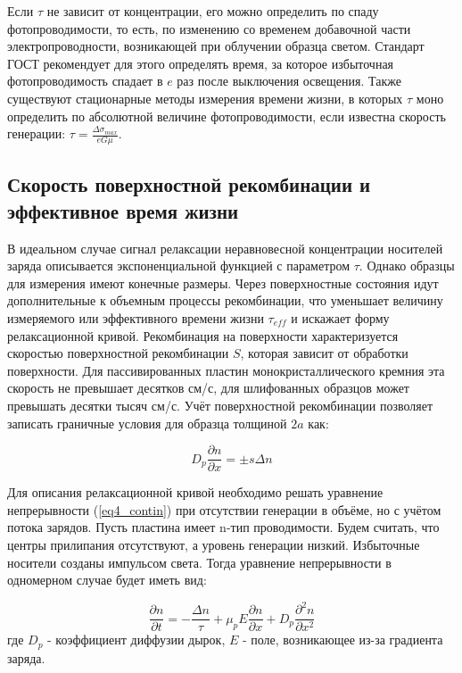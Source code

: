 Если $\tau$ не зависит от концентрации, его можно определить по спаду фотопроводимости, то есть, по изменению со временем добавочной части электропроводности, возникающей при облучении образца светом. Стандарт ГОСТ рекомендует для этого определять время, за которое избыточная фотопроводимость спадает в $e$ раз после выключения освещения. Также существуют стационарные методы измерения времени жизни, в которых $\tau$ моно определить по абсолютной величине фотопроводимости, если известна скорость генерации: $\tau = \frac{\Delta \sigma_{max}}{e G \mu}$.

\subsection{Скорость поверхностной рекомбинации и эффективное время жизни}

В идеальном случае сигнал релаксации неравновесной концентрации носителей заряда описывается экспоненциальной функцией с параметром $\tau$. Однако образцы для измерения имеют конечные размеры. Через поверхностные состояния идут дополнительные к объемным процессы рекомбинации, что уменьшает величину измеряемого или эффективного времени жизни $\tau_{eff}$ и искажает форму релаксационной кривой. Рекомбинация на поверхности характеризуется скоростью поверхностной рекомбинации $S$, которая зависит от обработки поверхности. Для пассивированных пластин монокристаллического кремния эта скорость не превышает десятков см/с, для шлифованных образцов может превышать десятки тысяч см/с. Учёт поверхностной рекомбинации позволяет записать граничные условия для образца толщиной $2 a$ как:

\begin{equation}
D_{p} \frac{\partial n}{\partial x} = \pm s \Delta n
\end{equation}

Для описания релаксационной кривой необходимо решать уравнение непрерывности (\ref{eq4_contin}) при отсутствии генерации в объёме, но с учётом потока зарядов. Пусть пластина имеет n-тип проводимости. Будем считать, что центры прилипания отсутствуют, а уровень генерации низкий. Избыточные носители созданы импульсом света. Тогда уравнение непрерывности в одномерном случае будет иметь вид:

\begin{equation}
\frac{\partial n}{\partial t} = -\frac{\Delta n}{\tau} + \mu_{p} E \frac{\partial n}{\partial x} + D_{p} \frac{\partial^2 n}{\partial x^2}
\label{eq4_relaxation}
\end{equation}
где $D_{p}$ - коэффициент диффузии дырок, $E$ - поле, возникающее из-за градиента заряда.

